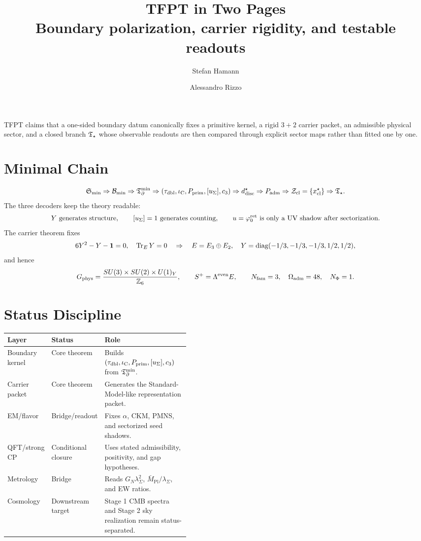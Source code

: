 \documentclass[10pt,a4paper]{article}
\title{\vspace{-2.2em}\color{tfptblue}\textbf{TFPT in Two Pages}\\[-0.15em]
{\large Boundary polarization, carrier rigidity, and testable readouts}}
\author{Stefan Hamann \and Alessandro Rizzo}
\date{\vspace{-1.0em}}
\begin{document}
\maketitle
\vspace{-1.5em}

\begin{tcolorbox}[colback=tfptblue!2, colframe=tfptblue!45, title={One-sentence claim}, colbacktitle=tfptblue!65]
TFPT claims that a one-sided boundary datum canonically fixes a primitive kernel, a rigid
$3+2$ carrier packet, an admissible physical sector, and a closed branch $\mathfrak T_{\star}$ whose observable
readouts are then compared through explicit sector maps rather than fitted one by one.
\end{tcolorbox}

\section*{Minimal Chain}
\[
\mathfrak S_{\min}\Rightarrow\mathcal B_{\min}\Rightarrow\mathfrak T_{\partial}^{\min}
\Rightarrow(\tau_{\mathrm{dbl}},\iota_{\mathrm C},P_{\mathrm{prim}},[u_\Sigma],c_3)
\Rightarrow d^\star_{\mathrm{disc}}
\Rightarrow P_{\mathrm{adm}}
\Rightarrow\mathcal Z_{\mathrm{cl}}=\{x^\star_{\mathrm{cl}}\}
\Rightarrow\mathfrak T_{\star} .
\]
The three decoders keep the theory readable:
\[
Y\ \text{generates structure},\qquad [u_\Sigma]=1\ \text{generates counting},\qquad
u=\varphi_0^{\mathrm{ret}}\ \text{is only a UV shadow after sectorization}.
\]
The carrier theorem fixes
\[
6Y^2-Y-\mathbf1=0,\quad \operatorname{Tr}_EY=0
\quad\Rightarrow\quad
E=E_3\oplus E_2,\quad
Y=\operatorname{diag}(-1/3,-1/3,-1/3,1/2,1/2),
\]
and hence
\[
G_{\mathrm{phys}}=\frac{SU(3)\times SU(2)\times U(1)_Y}{\mathbb Z_6},
\qquad
S^+=\Lambda^{\mathrm{even}}E,\qquad
N_{\mathrm{fam}}=3,\quad \Omega_{\mathrm{adm}}=48,\quad N_\Phi=1.
\]

\section*{Status Discipline}
\begin{center}
\small
\begin{tabularx}{\linewidth}{@{}p{0.20\linewidth}p{0.23\linewidth}Y@{}}
\toprule
Layer & Status & Role \\
\midrule
Boundary kernel & Core theorem & Builds $(\tau_{\mathrm{dbl}},\iota_{\mathrm C},P_{\mathrm{prim}},[u_\Sigma],c_3)$ from $\mathfrak T_{\partial}^{\min}$.\\
Carrier packet & Core theorem & Generates the Standard-Model-like representation packet.\\
EM/flavor & Bridge/readout & Fixes $\alpha$, CKM, PMNS, and sectorized seed shadows.\\
QFT/strong CP & Conditional closure & Uses stated admissibility, positivity, and gap hypotheses.\\
Metrology & Bridge & Reads $G_N\lambda_\Sigma^2$, $\bar M_{\mathrm{Pl}}/\lambda_\Sigma$, and EW ratios.\\
Cosmology & Downstream target & Stage 1 CMB spectra and Stage 2 sky realization remain status-separated.\\
\bottomrule
\end{tabularx}
\end{center}
\end{document}
